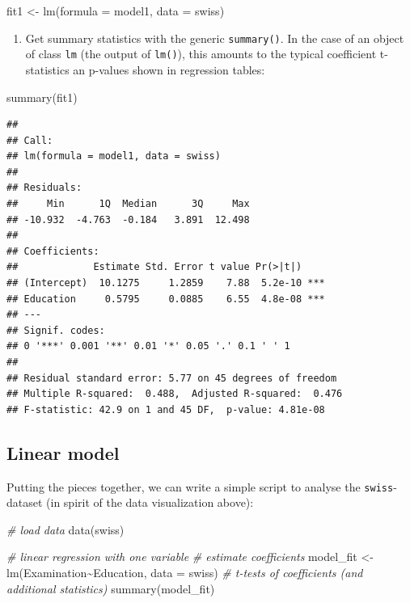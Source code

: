 \documentclass[
  12pt,
]{style/krantz}
\newenvironment{Shaded}{\begin{snugshade}}{\end{snugshade}}
\newcommand{\AttributeTok}[1]{\textcolor[rgb]{0.77,0.63,0.00}{#1}}
\newcommand{\CommentTok}[1]{\textcolor[rgb]{0.56,0.35,0.01}{\textit{#1}}}
\newcommand{\FunctionTok}[1]{\textcolor[rgb]{0.00,0.00,0.00}{#1}}
\newcommand{\NormalTok}[1]{#1}
\newcommand{\OtherTok}[1]{\textcolor[rgb]{0.56,0.35,0.01}{#1}}
\newcommand{\SpecialCharTok}[1]{\textcolor[rgb]{0.00,0.00,0.00}{#1}}
\providecommand{\tightlist}{%
  \setlength{\itemsep}{0pt}\setlength{\parskip}{0pt}}
\begin{document}
\begin{Shaded}
\begin{Highlighting}[]
\NormalTok{fit1 }\OtherTok{\textless{}{-}} \FunctionTok{lm}\NormalTok{(}\AttributeTok{formula =}\NormalTok{ model1, }\AttributeTok{data =}\NormalTok{ swiss)}
\end{Highlighting}
\end{Shaded}

\begin{enumerate}
\def\labelenumi{\arabic{enumi}.}
\setcounter{enumi}{2}
\tightlist
\item
  Get summary statistics with the generic \texttt{summary()}. In the case of an object of class \texttt{lm} (the output of \texttt{lm()}), this amounts to the typical coefficient t-statistics an p-values shown in regression tables:
\end{enumerate}

\begin{Shaded}
\begin{Highlighting}[]
\FunctionTok{summary}\NormalTok{(fit1)}
\end{Highlighting}
\end{Shaded}

\begin{verbatim}
## 
## Call:
## lm(formula = model1, data = swiss)
## 
## Residuals:
##     Min      1Q  Median      3Q     Max 
## -10.932  -4.763  -0.184   3.891  12.498 
## 
## Coefficients:
##             Estimate Std. Error t value Pr(>|t|)    
## (Intercept)  10.1275     1.2859    7.88  5.2e-10 ***
## Education     0.5795     0.0885    6.55  4.8e-08 ***
## ---
## Signif. codes:  
## 0 '***' 0.001 '**' 0.01 '*' 0.05 '.' 0.1 ' ' 1
## 
## Residual standard error: 5.77 on 45 degrees of freedom
## Multiple R-squared:  0.488,  Adjusted R-squared:  0.476 
## F-statistic: 42.9 on 1 and 45 DF,  p-value: 4.81e-08
\end{verbatim}

\hypertarget{linear-model}{%
\subsection{Linear model}\label{linear-model}}

Putting the pieces together, we can write a simple script to analyse the \texttt{swiss}-dataset (in spirit of the data visualization above):

\begin{Shaded}
\begin{Highlighting}[]
\CommentTok{\# load data}
\FunctionTok{data}\NormalTok{(swiss)}

\CommentTok{\# linear regression with one variable}
\CommentTok{\# estimate coefficients}
\NormalTok{model\_fit }\OtherTok{\textless{}{-}} \FunctionTok{lm}\NormalTok{(Examination}\SpecialCharTok{\textasciitilde{}}\NormalTok{Education, }\AttributeTok{data =}\NormalTok{ swiss)}
\CommentTok{\# t{-}tests of coefficients (and additional statistics)}
\FunctionTok{summary}\NormalTok{(model\_fit)}
\end{Highlighting}
\end{Shaded}
\end{document}
